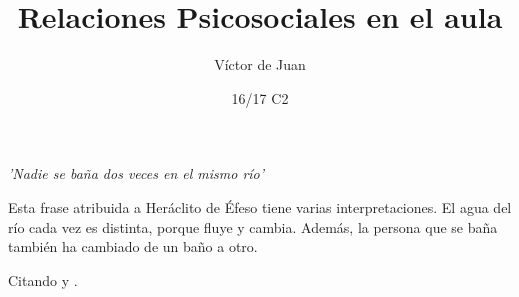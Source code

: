 \documentclass[palatino]{apuntesURJC}
\title{Relaciones Psicosociales en el aula}
\author{Víctor de Juan}
\date{16/17 C2}
\begin{document}
\pagestyle{plain}
\maketitle

\tableofcontents
\newpage

\textit{’Nadie se baña dos veces en el mismo río’}

Esta frase atribuida a Heráclito de Éfeso tiene varias interpretaciones. 
%
El agua del río cada vez es distinta, porque fluye y cambia. 
%
Además, la persona que se baña también ha cambiado de un baño a otro.

Citando \cite{Tema1} y \cite{Tema2}.

\appendix




\label{bibliografia}

\printindex
\end{document}
